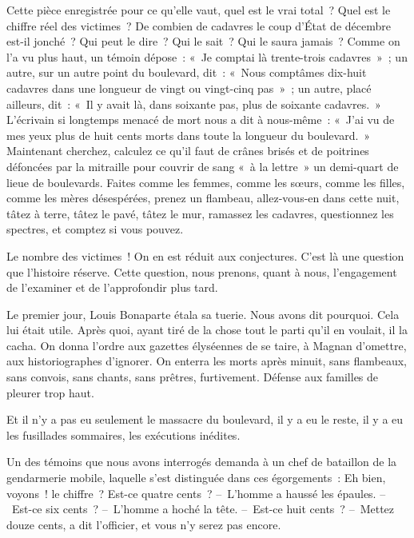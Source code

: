 \documentclass[french,twoside]{book} %
\begin{document}
Cette pièce enregistrée pour ce qu’elle vaut, quel est le vrai total ? Quel est le chiffre réel des victimes ? De combien de cadavres le coup d’État de décembre est-il jonché ? Qui peut le dire ? Qui le sait ? Qui le saura jamais ? Comme on l’a vu plus haut, un témoin dépose : « Je comptai là trente-trois cadavres » ; un autre, sur un autre point du boulevard, dit : « Nous comptâmes dix-huit cadavres dans une longueur de vingt ou vingt-cinq pas » ; un autre, placé ailleurs, dit : « Il y avait là, dans soixante pas, plus de soixante cadavres. » L’écrivain si longtemps menacé de mort nous a dit à nous-même : « J’ai vu de mes yeux plus de huit cents morts dans toute la longueur du boulevard. » Maintenant cherchez, calculez ce qu’il faut de crânes brisés et de poitrines défoncées par la mitraille pour couvrir de sang « à la lettre » un demi-quart de lieue de boulevards. Faites comme les femmes, comme les sœurs, comme les filles, comme les mères désespérées, prenez un flambeau, allez-vous-en dans cette nuit, tâtez à terre, tâtez le pavé, tâtez le mur, ramassez les cadavres, questionnez les spectres, et comptez si vous pouvez.\par
Le nombre des victimes ! On en est réduit aux conjectures. C’est là une question que l’histoire réserve. Cette question, nous prenons, quant à nous, l’engagement de l’examiner et de l’approfondir plus tard.\par
Le premier jour, Louis Bonaparte étala sa tuerie. Nous avons dit pourquoi. Cela lui était utile. Après quoi, ayant tiré de la chose tout le parti qu’il en voulait, il la cacha. On donna l’ordre aux gazettes élyséennes de se taire, à Magnan d’omettre, aux historiographes d’ignorer. On enterra les morts après minuit, sans flambeaux, sans convois, sans chants, sans prêtres, furtivement. Défense aux familles de pleurer trop haut.\par
Et il n’y a pas eu seulement le massacre du boulevard, il y a eu le reste, il y a eu les fusillades sommaires, les exécutions inédites.\par
Un des témoins que nous avons interrogés demanda à un chef de bataillon de la gendarmerie mobile, laquelle s’est distinguée dans ces égorgements : Eh bien, voyons ! le chiffre ? Est-ce quatre cents ? – L’homme a haussé les épaules. – Est-ce six cents ? – L’homme a hoché la tête. – Est-ce huit cents ? – Mettez douze cents, a dit l’officier, et vous n’y serez pas encore.\par
\end{document}
